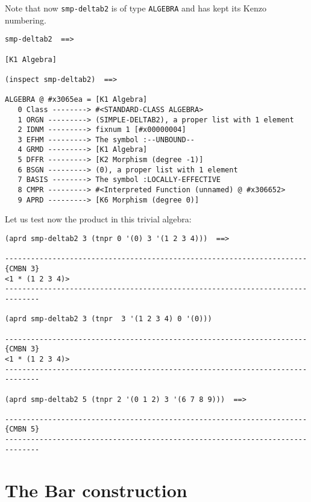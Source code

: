 Note that now {\tt smp-deltab2}  is of type {\tt ALGEBRA} and has kept
its Kenzo numbering.
{\footnotesize\begin{verbatim}
smp-deltab2  ==>

[K1 Algebra]

(inspect smp-deltab2)  ==>

ALGEBRA @ #x3065ea = [K1 Algebra]
   0 Class --------> #<STANDARD-CLASS ALGEBRA>
   1 ORGN ---------> (SIMPLE-DELTAB2), a proper list with 1 element
   2 IDNM ---------> fixnum 1 [#x00000004]
   3 EFHM ---------> The symbol :--UNBOUND--
   4 GRMD ---------> [K1 Algebra]
   5 DFFR ---------> [K2 Morphism (degree -1)]
   6 BSGN ---------> (0), a proper list with 1 element
   7 BASIS --------> The symbol :LOCALLY-EFFECTIVE
   8 CMPR ---------> #<Interpreted Function (unnamed) @ #x306652>
   9 APRD ---------> [K6 Morphism (degree 0)]
\end{verbatim}}
Let us test now the product in this trivial algebra:
{\footnotesize\begin{verbatim}
(aprd smp-deltab2 3 (tnpr 0 '(0) 3 '(1 2 3 4)))  ==>

----------------------------------------------------------------------{CMBN 3}
<1 * (1 2 3 4)>
------------------------------------------------------------------------------

(aprd smp-deltab2 3 (tnpr  3 '(1 2 3 4) 0 '(0)))

----------------------------------------------------------------------{CMBN 3}
<1 * (1 2 3 4)>
------------------------------------------------------------------------------

(aprd smp-deltab2 5 (tnpr 2 '(0 1 2) 3 '(6 7 8 9)))  ==>

----------------------------------------------------------------------{CMBN 5}
------------------------------------------------------------------------------
\end{verbatim}}

\section {The Bar construction}

